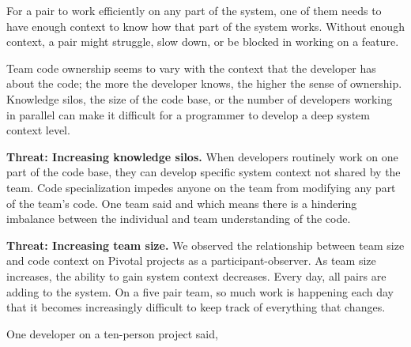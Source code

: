 For a pair to work efficiently on any part of the system, one of them needs to have enough context to know how that part of the system works. Without enough context, a pair might struggle, slow down, or be blocked in working on a feature.

Team code ownership seems to vary with the context that the developer has about the code; the more the developer knows, the higher the sense of ownership. Knowledge silos, the size of the code base, or the number of developers working in parallel can make it difficult for a programmer to develop a deep system context level.

\textbf{Threat: Increasing knowledge silos.} When developers routinely work on one part of the code base, they can develop specific system context not shared by the team. Code specialization impedes anyone on the team from modifying any part of the team's code.  One team said  and  which means there is a hindering imbalance between the individual and team understanding of the code.


\textbf{Threat: Increasing team size.} We observed the relationship between team size and code context on \numberOfObservedProjects{} Pivotal projects as a participant-observer. As team size increases, the ability to gain system context decreases. Every day, all pairs are adding to the system. On a five pair team, so much work is happening each day that it becomes increasingly difficult to keep track of everything that changes.

One developer on a ten-person project said, 

